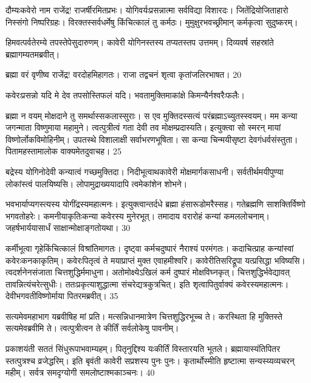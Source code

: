   दौम्यःकवेरो नाम राजेंद्र! राजर्षीरमितप्रभः।
 योगिवर्यःप्रसन्नात्मा सर्वविद्या विशारदः।
 जितेंद्रियोजिताहारो निस्संगो निष्परिग्रहः।
 विरक्तस्सर्वधर्मेषु किंचित्कालं तु कर्मठः।
 मुमुक्षुरभवच्छ्रीमान् कर्मकृत्वा सुदुष्करम्।
 
हिमवत्पर्वतेरम्ये तपस्तेपेसुदारुणम्।
 कावेरी योगिनस्तस्य तप्यतस्तप उत्तमम्।
 दिव्यवर्ष सहस्रांते ब्रह्मागम्यतमब्रवीत्।
 
ब्रह्मा
वरं वृणीष्व राजेंद्र! वरदोहमिहागतः।
 राजा तद्वचनं शृत्वा कृतांजलिरभाषत।
 20

  कवेरःप्रसन्नो यदि मे देव तपसोस्तिफलं यदि।
 भवतामुक्तिमाकांक्षे किमन्यैर्नश्वरैःफलैः।
 
ब्रह्मा
न वयम् मोक्षदाने तु समर्थास्सकलास्सुराः।
 स एव मुक्तिदस्सत्यं परंब्रह्माऽच्युतस्स्वयम्।
 मम कन्या जगन्माता विष्णुमाया महामुने।
 त्वत्पुत्रीत्वं गता देवी तव मोक्षम्प्रदास्यति।
 इत्युक्त्वा सो स्मरन् मायां विष्णोर्लोकविमोहिनीम्।
 उपतस्थे विशालाक्षी सर्वाभरणभूषिता।
 सा कन्या चिन्मयीसृष्टा देवगंधर्वसंस्तुता।
 पितामहस्तामालोक वाक्यमेतदुवाचह।
 25

  बद्रेस्य योगिनोदेवी कन्यात्वं गच्छमुक्तिदा।
 निदीभूत्वाथकावेरी मोक्षमार्गकसाधनी।
 सर्वतीर्थमयीपुण्या लोकांस्त्वं पालयिष्यसि।
 लोपामुद्राख्ययादापि त्वमेकांशेन शोभने।
 
भवभार्याप्यगस्त्यस्य योगींद्रस्यमहात्मनः।
 इत्युक्त्वान्तर्दधे ब्रह्मा हंसारूडोमरैस्सह।
 गतेब्रह्मणि साशक्तिर्विष्णो भगवतोहरेः।
 कमनीयाकृतिःकन्या कवेरस्य मुनेरभूत्।
 तमादाय वरारोहं कन्यां कमललोचनाम्।
 जहर्षभार्ययासार्धं साक्षान्मोक्षाङ्गतोयथा।
 30

  कर्मीभूत्वा गृहेकिंचित्कालं विश्रांतिमागतः।
 दृष्ट्वा कर्मचदुष्पारं नैराश्यं परमंगतः।
 कदाचित्प्राह कन्यांस्वां कवेरःकनकाकृतिम्।
 कवेरःपितृत्वं ते मयाप्राप्तं मुक्त एवाहमीश्वरि।
 कावेरीतिसरिद्रूपा यत्प्रसिद्धा भविष्यसि।
 त्वदर्शनेनसंजाता चित्तशुद्धिर्ममाधुना।
 अतोमोक्ष्येऽखिलं कर्म दुष्पारं मोक्षविघ्नकृत्।
 चित्तशुद्धिर्भवेद्यावत् तावन्नित्यंचरेत्सुधीः।
 ततःप्रकृत्याशुद्धात्मा संचरेद्यत्रकुत्रचित्।
 इति शृत्वापितुर्वाक्यं कवेरस्यमहात्मनः।
 देवीभगवतीविष्णोर्माया पितरमब्रवीत्।
 35

  सत्यमेवमहाभाग यब्रवीषिह मां प्रति।
 मत्सन्निधानमात्रेण चित्तशुद्धिरभूच्च ते।
 करस्थिता हि मुक्तिस्ते सत्यमेवब्रवीमि ते।
 त्वत्पुत्रीत्वन ते कीर्तिं सर्वलोकेषु पावनीम्।
 
प्रकाशयंती सततं सिंधुरूपाभवाम्यहम्।
 पितृनुद्दिश्य यःकीर्तिं विस्तारयति भूतले।
 ब्रह्मायास्यंतिपितर स्तत्पुत्रश्च व्रजेद्धरिम्।
 इति बृवंती कावेरी सप्रशस्य पुनः पुनः।
 कृतार्थोस्मीति हृष्टात्मा सन्यस्य्यव्यचरन् महीम्।
 सर्वत्र समदृग्योगी समलोष्टाश्मकाञ्चनः।
 40

